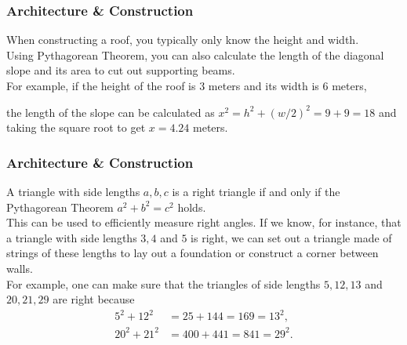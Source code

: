 \documentclass[aspectratio=169,11pt,svgnames]{beamer}
\newcommand{\clc}{\textcolor{PolygonCyan}}
\newcommand{\clo}{\textcolor{PolygonOrange}}
\begin{document}
\begin{frame}
 \frametitle{Architecture \& Construction}
 When constructing a roof, you typically only know the \clc{height} and
 \clo{width}.\\
 \pause 
 Using Pythagorean Theorem, you can also calculate the length of the diagonal
 slope and its area to cut out supporting beams.\\
 \pause
 For example, if the \clc{height} of the roof is 3 meters and its \clo{width} is
 6 meters,
 \begin{center}
 \end{center}
 the length of the slope can be calculated as $x^2 = h^2 + (w / 2)^2 = 9 + 9 =
 18$ and taking the square root to get $x = 4.24$ meters.
\end{frame}

\begin{frame}
 \frametitle{Architecture \& Construction}
 A triangle with side lengths $a,b,c$ is a right triangle if and only if the
 Pythagorean Theorem $a^2 + b^2 = c^2$ holds.\\
 \pause
 This can be used to efficiently measure right angles. If we know, for instance,
 that a triangle with side lengths $3,4$ and $5$ is right, we can set out a
 triangle made of strings of these lengths to lay out a foundation or construct
 a corner between walls.\\
 \pause
 For example, one can make sure that the triangles of side lengths $5,12,13$ and
 $20,21,29$ are right because
 \begin{align*}
  5^2 + 12^2 &= 25 + 144 = 169 = 13^2,\\
  20^2 + 21^2 &= 400 + 441 = 841 = 29^2.
 \end{align*}
\end{frame}
\end{document}

